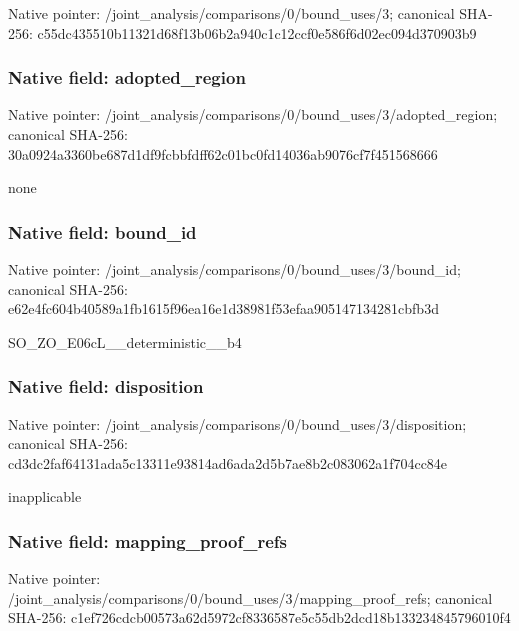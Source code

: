 \documentclass[10pt,a4paper]{article}
\begin{document}
Native pointer: /joint\_analysis/comparis\allowbreak{}ons/0/bound\_uses/3; canonical SHA-256: c55dc435510b11321d68f13b\allowbreak{}06b2a940c1c12ccf0e586f6d\allowbreak{}02ec094d370903b9



\subsubsection{Native field: adopted\_region}


Native pointer: /joint\_analysis/comparis\allowbreak{}ons/0/bound\_uses/3/adopt\allowbreak{}ed\_region; canonical SHA-256: 30a0924a3360be687d1df9fc\allowbreak{}bbfdff62c01bc0fd14036ab9\allowbreak{}076cf7f451568666


none


\subsubsection{Native field: bound\_id}


Native pointer: /joint\_analysis/comparis\allowbreak{}ons/0/bound\_uses/3/bound\allowbreak{}\_id; canonical SHA-256: e62e4fc604b40589a1fb1615\allowbreak{}f96ea16e1d38981f53efaa90\allowbreak{}5147134281cbfb3d


SO\_ZO\_E06cL\_\_deterministic\_\_b4


\subsubsection{Native field: disposition}


Native pointer: /joint\_analysis/comparis\allowbreak{}ons/0/bound\_uses/3/dispo\allowbreak{}sition; canonical SHA-256: cd3dc2faf64131ada5c13311\allowbreak{}e93814ad6ada2d5b7ae8b2c0\allowbreak{}83062a1f704cc84e


inapplicable


\subsubsection{Native field: mapping\_proof\_refs}


Native pointer: /joint\_analysis/comparis\allowbreak{}ons/0/bound\_uses/3/mappi\allowbreak{}ng\_proof\_refs; canonical SHA-256: c1ef726cdcb00573a62d5972\allowbreak{}cf8336587e5c55db2dcd18b1\allowbreak{}33234845796010f4
\end{document}
